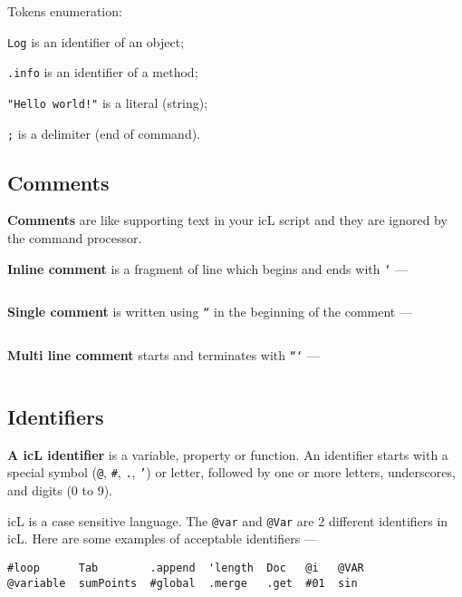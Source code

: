 Tokens enumeration:
\begin{icItems}
\item
	\texttt{Log} is an identifier of an object;
\item
	\texttt{.info} is an identifier of a method;
\item
	\texttt{"Hello world!"} is a literal (string);
\item
	\texttt{;} is a delimiter (end of command).
\end{icItems}

\subsection{Comments}

\textbf{Comments} are like supporting text in your icL script and they are ignored by the command processor.

\textbf{Inline comment} is a fragment of line which begins and ends with \texttt{`} —

\inputminted[linenos]{icl}{../sources/inlinecomment.icL}

\textbf{Single comment} is written using \texttt{``} in the beginning of the comment —

\inputminted[linenos]{icl}{../sources/linecomment.icL}

\textbf{Multi line comment} starts and terminates with \texttt{```} —

\inputminted[linenos]{icl}{../sources/multilinecomment.icL}

\subsection{Identifiers}

\textbf{A icL identifier} is a variable, property or function.
An identifier starts with a special symbol (\texttt{@}, \texttt{#}, \texttt{.}, \texttt{'}) or letter, followed by one or more letters, underscores, and digits (0 to 9).

icL is a case sensitive language. The \texttt{@var} and \texttt{@Var} are 2 different identifiers in icL. Here are some examples of acceptable identifiers —

\begin{verbatim}
#loop      Tab        .append  'length  Doc   @i   @VAR
@variable  sumPoints  #global  .merge   .get  #01  sin
\end{verbatim}

